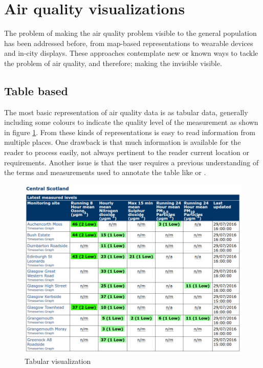 \section{Air quality visualizations}
The problem of making the air quality problem visible to the general population has been addressed before, from map-based representations to wearable devices and in-city displays. These approaches contemplate new or known ways to tackle the problem of air quality, and therefore; making the invisible visible.

\subsection{Table based}
The most basic representation of air quality data is as tabular data, generally including some colours to indicate the quality level of the measurement as shown in figure \ref{fig:table_based_visualization}. From these kinds of representations is easy to read information from multiple places. One drawback is that much information is available for the reader to process easily, not always pertinent to the reader current location or requirements. Another issue is that the user requires a previous understanding of the terms and measurements used to annotate the table like  or . 

\begin{figure}[H]
\begin{adjustbox}{width=1\textwidth,center=\textwidth}
  \centering
  \includegraphics[scale=1]{images/tabular_data.png}
\end{adjustbox}
  \caption[Tabular visualization]{Tabular visualization \cite{DepartmentforEnvironment}}
  \label{fig:table_based_visualization}
\end{figure}

